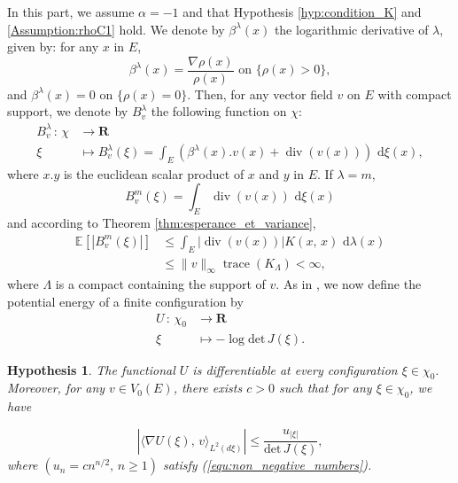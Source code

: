 \documentclass[11pt,a4paper]{amsart}
\newtheorem{hyp}{Hypothesis}
\begin{document}
In this part, we assume $\alpha=-1$ and that Hypothesis
\ref{hyp:condition_K} and \ref{Assumption:rhoC1} hold. We denote by
$\beta^{\lambda}(x)$ the logarithmic derivative of $\lambda$, given
by: for any $x$ in $E$,
\begin{equation*}
  \beta^{\lambda}(x)=\frac{\nabla\rho(x)}{\rho(x)} \text{   on }\{\rho(x)>0\},
\end{equation*}
and $\beta^{\lambda}(x)=0$ on $\{\rho(x)=0\}$.  Then, for any vector
field $v$ on $E$ with compact support, we denote by $B_v^\lambda$ the
following function on $\chi$:
\begin{align*}
  B_v^\lambda\, :\, \chi &\longrightarrow {{\mathbf R}}\\
  \xi &\longmapsto B^{\lambda}_v(\xi)=\int_E
  \left(\beta^{\lambda}(x).v(x) + {\operatorname{div}} (v(x))\right){\text{ d}}\xi(x),
\end{align*}
where $x.y$ is the euclidean scalar product of $x$ and $y$ in $E$.  If
$\lambda=m$,
\begin{equation*}
  B_v^m(\xi)=\int_E {\operatorname{div}} (v(x)){\text{ d}}\xi(x)
\end{equation*}
and according to Theorem \ref{thm:esperance_et_variance},
\begin{align*}
  {{\mathbb E}_{{}}\left[{{| B_v^m(\xi)|}}\right]}&\le  \int_E |{\operatorname{div}} (v(x))| K(x,\, x){\text{ d}}\lambda(x)\\
  &\le \|v\|_\infty {\operatorname{trace}}(K_\Lambda)<\infty,
\end{align*}
where $\Lambda$ is a compact containing the support of $v$.  As in
\cite{MR2108363}, we now define the potential energy of a finite
configuration by
\begin{align*}
  U\, :\, \chi_0 & \longrightarrow {{\mathbf R}}\\
  \xi & \longmapsto -\log {{\text{det}}}\, J(\xi).
\end{align*}
\begin{hyp}
  \label{hyp:H_differentiable}
  The functional $U$ is differentiable at every configuration $\xi\in
  \chi_0.$ Moreover, for any $v\in V_0(E)$, there exists $c >0$ such
  that for any $\xi\in \chi_0$, we have
  
  
  
  
  \begin{equation}\label{eq:9}
    \left| \langle \nabla U(\xi),\, v\rangle_{L^2(d\xi)}\right|\le  \frac{u_{|\xi|}}{{{\text{det}}}\, J(\xi)},
  \end{equation}
  where $(u_n=c n^{n/2},\,  n\ge 1)$ satisfy (\ref{equ:non_negative_numbers}).
\end{hyp}
\end{document}
